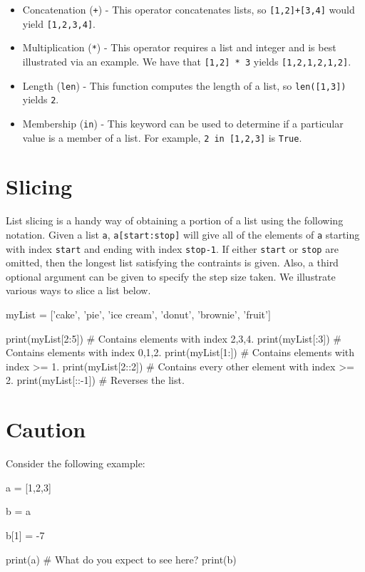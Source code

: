 \documentclass{ximera}
\begin{document}
\begin{itemize}
	\item Concatenation (\verb|+|) - This operator concatenates lists, so \verb|[1,2]+[3,4]| would yield \verb|[1,2,3,4]|.
	\item Multiplication (\verb|*|) - This operator requires a list and integer and is best illustrated via an example. We have that \verb|[1,2] * 3| yields \verb|[1,2,1,2,1,2]|.
	\item Length (\verb|len|) - This function computes the length of a list, so \verb|len([1,3])| yields \verb|2|.
	\item Membership (\verb|in|) - This keyword can be used to determine if a particular value is a member of a list. For example, \verb|2 in [1,2,3]| is \verb|True|.
\end{itemize}

\section{Slicing}

List slicing is a handy way of obtaining a portion of a list using the following notation. Given a list \verb|a|, \verb|a[start:stop]| will give all of the elements of \verb|a| starting with index \verb|start| and ending with index \verb|stop-1|. If either \verb|start| or \verb|stop| are omitted, then the longest list satisfying the contraints is given. Also, a third optional argument can be given to specify the step size taken. We illustrate various ways to slice a list below.

\begin{sageCell}
myList = ['cake', 'pie', 'ice cream', 'donut', 'brownie', 'fruit']

print(myList[2:5])  # Contains elements with index 2,3,4.
print(myList[:3])   # Contains elements with index 0,1,2.
print(myList[1:])   # Contains elements with index >= 1.
print(myList[2::2]) # Contains every other element with index >= 2.
print(myList[::-1]) # Reverses the list.
\end{sageCell}

\section{Caution}

Consider the following example:

\begin{sageCell}
a = [1,2,3]

b = a

b[1] = -7

print(a) # What do you expect to see here?
print(b)
\end{sageCell}
\end{document}

